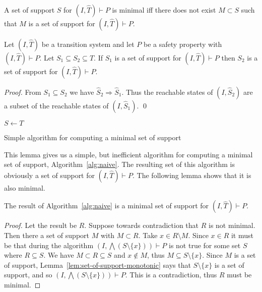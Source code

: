 \begin{definition}
  \label{def:minimal-set-of-support}
  A set of support $S$ for $(I, \widehat T)\vdash P$ is minimal iff
  there does not exist $M \subset S$ such that $M$ is a set of support
  for $(I, \widehat T)\vdash P$.
\end{definition}

\begin{lemma}
  \label{lem:set-of-support-monotonic}
  Let $(I, \widehat T)$ be a transition system and let $P$ be a
  safety property with $(I, \widehat T)\vdash P$. Let $S_1 \subseteq
  S_2 \subseteq T$. If $S_1$ is a set of support for $(I, \widehat
  T)\vdash P$ then $S_2$ is a set of support for $(I, \widehat T)\vdash P$.
\end{lemma}
\begin{proof}
  From $S_1 \subseteq S_2$ we have $\widehat S_2 \Rightarrow \widehat
  S_1$. Thus the reachable states of $(I, \widehat S_2)$ are a subset
  of the reachable states of $(I, \widehat S_1)$. \qed
\end{proof}

\begin{algorithm}[t]
  \BlankLine
  $S \leftarrow T$ \\
   {
  }
\caption{Simple algorithm for computing a minimal set of support}
\label{alg:naive}
\end{algorithm}

This lemma gives us a simple, but inefficient algorithm for computing
a minimal set of support, Algorithm~\ref{alg:naive}. The resulting set
of this algorithm is obviously a set of support for $(I, \widehat
T)\vdash P$. The following lemma shows that it is also minimal.

\begin{lemma}
  The result of Algorithm~\ref{alg:naive} is a minimal set of support
  for $(I, \widehat T)\vdash P$.
\end{lemma}
\begin{proof}
  Let the result be $R$. Suppose towards contradiction that $R$ is not
  minimal. Then there a set of support $M$ with $M \subset R$. Take $x
  \in R\setminus M$. Since $x \in R$ it must be that during the
  algorithm $(I, \bigwedge(S\setminus\{x\}))\vdash P$ is not true for
  some set $S$ where $R \subseteq S$. We have $M \subset R \subseteq
  S$ and $x\not\in M$, thus $M \subseteq S\setminus \{x\}$. Since $M$
  is a set of support, Lemma~\ref{lem:set-of-support-monotonic} says
  that $S\setminus \{x\}$ is a set of support, and so $(I, \bigwedge
  (S\setminus\{x\}))\vdash P$. This is a contradiction, thus $R$ must
  be minimal.
\end{proof}


